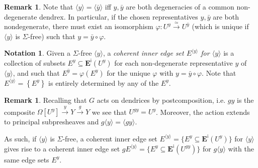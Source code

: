 \documentclass[a4paper,10pt
,draft
]{article}%
\numberwithin{equation}{section}
\numberwithin{figure}{section}
\theoremstyle{definition} %
\newtheorem{remark}[equation]{Remark}%
\newtheorem{notation}[equation]{Notation}%
\newcommand{\1}{\ensuremath{\mathbbm 1}}%
\begin{document}
\begin{remark}
	Note that
	$\langle y \rangle = \langle \bar{y} \rangle$
	iff $y,\bar{y}$ are both degeneracies of a common non-degenerate dendrex.
	In particular, if the chosen representatives $y,\bar{y}$ are both nondegenerate,
	there must exist an isomorphism
	$\varphi \colon U^y \xrightarrow{\simeq} U^{\bar{y}}$
	(which is unique if 
	$\langle y \rangle$ is $\Sigma$-free)
	such that $y= \bar{y} \circ \varphi$.
	
\end{remark}


\begin{notation}
	Given a $\Sigma$-free $\langle y \rangle$,
	a \emph{coherent inner edge set $E^{\langle y \rangle}$ for $\langle y \rangle$}
	is a collection of subsets 
	$E^y \subseteq \boldsymbol{E}^{\mathsf{i}}(U^y)$
	for each non-degenerate representative $y$ of $\langle y \rangle$, and such that 
	$E^{\bar{y}}  = \varphi \left(E^y \right)$
	for the unique $\varphi$ with $y= \bar{y} \circ \varphi$.
	Note that $E^{\langle y \rangle} = \left\{E^y \right\}$
	is entirely determined by any of the $E^y$.
\end{notation}


\begin{remark}
	Recalling that $G$ acts on dendrices by postcomposition, i.e.
	$gy$ is the composite
	$\Omega[U^y] \xrightarrow{y} Y \xrightarrow{g} Y$
	we see that $U^{gy} = U^{y}$.
	Moreover, the action extends to principal subpresheaves and
	$g \langle y \rangle = \langle g y \rangle$.
	
	As such, if $\langle y\rangle$ is $\Sigma$-free, a coherent inner edge set 
	$E^{\langle y \rangle} = \{E^y \subseteq \boldsymbol{E}^{\mathsf{i}}(U^y)\}$
	for $\langle y \rangle$
	gives rise to a coherent inner edge set 
	$g E^{\langle y \rangle} = \{E^y \subseteq \boldsymbol{E}^{\mathsf{i}}(U^{gy})\}$
	for $g\langle y \rangle$
	with the same edge sets $E^y$.
\end{remark}
\end{document}
